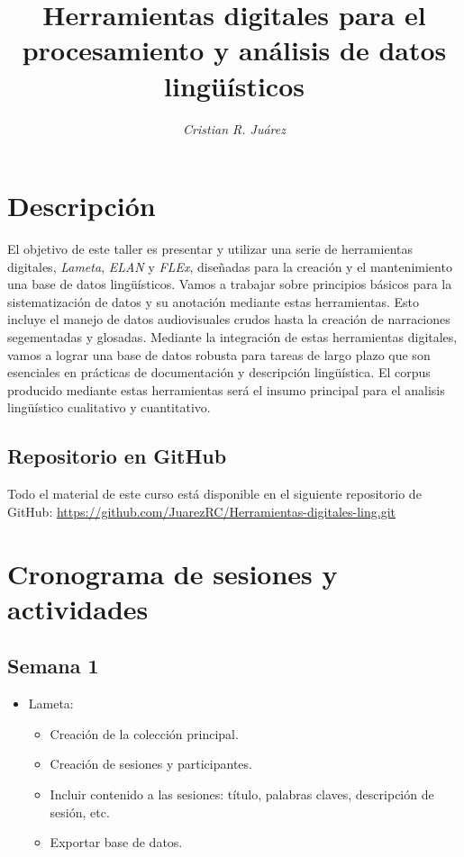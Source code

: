 \documentclass[12pt]{article}
\title{\textbf{Herramientas digitales para el procesamiento y análisis de datos lingüísticos}}
\author{\textit{Cristian R. Juárez} \vspace{-3mm}}
\affil{Instituto Federal de Tecnología de Zürich\vspace{-3mm}}
\affil{\href{mailto:juarezcristianr@gmail.com}{juarezcristianr@gmail.com}}
\date{}
\begin{document}
\maketitle

\section{Descripción}
El objetivo de este taller es presentar y utilizar una serie de herramientas digitales, \textit{Lameta}, \textit{ELAN} y \textit{FLEx}, diseñadas para la creación y el mantenimiento una base de datos lingüísticos. Vamos a trabajar sobre principios básicos para la sistematización de datos y su anotación mediante estas herramientas. Esto incluye el manejo de datos audiovisuales crudos hasta la creación de narraciones segementadas y glosadas. Mediante la integración de estas herramientas digitales, vamos a lograr una base de datos robusta para tareas de largo plazo que son esenciales en prácticas de documentación y descripción lingüística. El corpus producido mediante estas herramientas será el insumo principal para el analisis lingüístico cualitativo y cuantitativo.

\subsection{Repositorio en GitHub}
Todo el material de este curso está disponible en el siguiente repositorio de GitHub: \url{https://github.com/JuarezRC/Herramientas-digitales-ling.git}

\section{Cronograma de sesiones y actividades}

\subsection*{Semana 1}
\begin{itemize}
\item Lameta:
\begin{itemize}
\item Creación de la colección principal. 
\item Creación de sesiones y participantes.
\item Incluir contenido a las sesiones: título, palabras claves, descripción de sesión, etc. 
\item Exportar base de datos.
\end{itemize}
\end{itemize}
\end{document}
